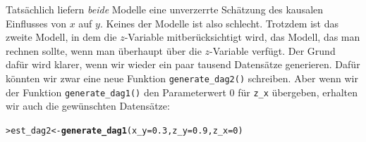 \documentclass[oneside, 10pt]{book}\usepackage[]{graphicx}\usepackage[]{xcolor}
\makeatletter
\newcommand{\hlnum}[1]{\textcolor[rgb]{0.686,0.059,0.569}{#1}}%
\newcommand{\hlstd}[1]{\textcolor[rgb]{0.345,0.345,0.345}{#1}}%
\newcommand{\hlkwb}[1]{\textcolor[rgb]{0.69,0.353,0.396}{#1}}%
\newcommand{\hlkwc}[1]{\textcolor[rgb]{0.333,0.667,0.333}{#1}}%
\newcommand{\hlkwd}[1]{\textcolor[rgb]{0.737,0.353,0.396}{\textbf{#1}}}%
\newenvironment{kframe}{%
 \def\at@end@of@kframe{}%
 \ifinner\ifhmode%
  \def\at@end@of@kframe{\end{minipage}}%
  \begin{minipage}{\columnwidth}%
 \fi\fi%
 \def\FrameCommand##1{\hskip\@totalleftmargin \hskip-\fboxsep
 \colorbox{shadecolor}{##1}\hskip-\fboxsep
     \hskip-\linewidth \hskip-\@totalleftmargin \hskip\columnwidth}%
 \MakeFramed {\advance\hsize-\width
   \@totalleftmargin\z@ \linewidth\hsize
   \@setminipage}}%
 {\par\unskip\endMakeFramed%
 \at@end@of@kframe}
\newenvironment{knitrout}{}{} %
\makeatother
\begin{document}
Tatsächlich liefern \emph{beide} Modelle eine unverzerrte Schätzung des kausalen Einflusses
von $x$ auf $y$. Keines der Modelle ist also schlecht. Trotzdem ist das zweite Modell,
in dem die $z$-Variable mitberücksichtigt wird, das Modell, das man rechnen sollte,
wenn man überhaupt über die $z$-Variable verfügt. Der Grund dafür wird klarer, wenn
wir wieder ein paar tausend Datensätze generieren.
Dafür könnten
wir zwar eine neue Funktion \texttt{generate\_dag2()}
schreiben. Aber wenn wir der Funktion \texttt{generate\_dag1()}
den Parameterwert 0 für \texttt{z\_x}
übergeben, erhalten wir auch die gewünschten Datensätze:
\begin{knitrout}
\color{fgcolor}\begin{kframe}
\begin{alltt}
\hlstd{> }\hlstd{est_dag2} \hlkwb{<-} \hlkwd{generate_dag1}\hlstd{(}\hlkwc{x_y} \hlstd{=} \hlnum{0.3}\hlstd{,} \hlkwc{z_y} \hlstd{=} \hlnum{0.9}\hlstd{,} \hlkwc{z_x} \hlstd{=} \hlnum{0}\hlstd{)}
\end{alltt}
\end{kframe}
\end{knitrout}
\end{document}
